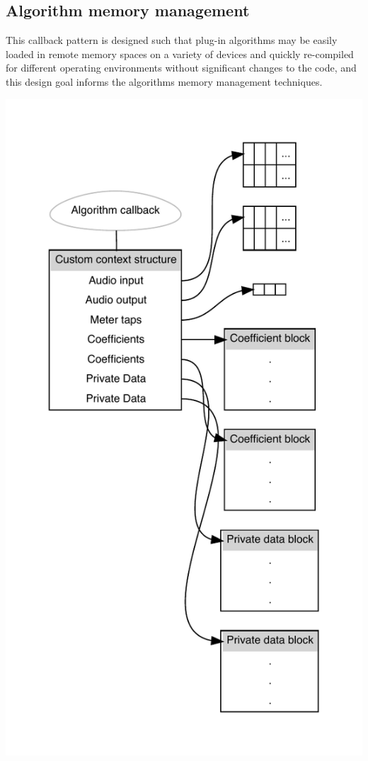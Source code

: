  \hypertarget{a00797_alg_memmgmt}{}\subsection{Algorithm memory management}\label{a00797_alg_memmgmt}
 This callback pattern is designed such that plug-\/in algorithms may be easily loaded in remote memory spaces on a variety of devices and quickly re-\/compiled for different operating environments without significant changes to the code, and this design goal informs the algorithm\textquotesingle{}s memory management techniques.

 
\begin{DoxyImageNoCaption}
  \mbox{\includegraphics[width=\textwidth,height=\textheight/2,keepaspectratio=true]{dot_aax_alg_context}}
\end{DoxyImageNoCaption}



